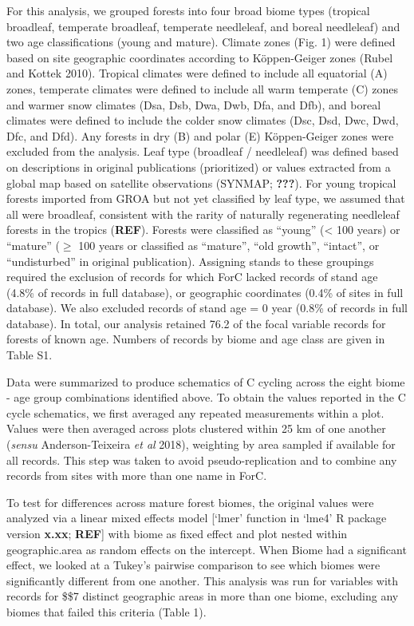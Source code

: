 \documentclass[
]{article}
\begin{document}
For this analysis, we grouped forests into four broad biome types
(tropical broadleaf, temperate broadleaf, temperate needleleaf, and
boreal needleleaf) and two age classifications (young and mature).
Climate zones (Fig. 1) were defined based on site geographic coordinates
according to Köppen-Geiger zones (Rubel and Kottek 2010). Tropical
climates were defined to include all equatorial (A) zones, temperate
climates were defined to include all warm temperate (C) zones and warmer
snow climates (Dsa, Dsb, Dwa, Dwb, Dfa, and Dfb), and boreal climates
were defined to include the colder snow climates (Dsc, Dsd, Dwc, Dwd,
Dfc, and Dfd). Any forests in dry (B) and polar (E) Köppen-Geiger zones
were excluded from the analysis. Leaf type (broadleaf / needleleaf) was
defined based on descriptions in original publications (prioritized) or
values extracted from a global map based on satellite observations
(SYNMAP; {\textbf{???}}). For young tropical forests imported from GROA
but not yet classified by leaf type, we assumed that all were broadleaf,
consistent with the rarity of naturally regenerating needleleaf forests
in the tropics (\textbf{REF}). Forests were classified as ``young''
(\textless{} 100 years) or ``mature'' (\(\ge\) 100 years or classified
as ``mature'', ``old growth'', ``intact'', or ``undisturbed'' in
original publication). Assigning stands to these groupings required the
exclusion of records for which ForC lacked records of stand age (4.8\%
of records in full database), or geographic coordinates (0.4\% of sites
in full database). We also excluded records of stand age = 0 year (0.8\%
of records in full database). In total, our analysis retained 76.2 of
the focal variable records for forests of known age. Numbers of records
by biome and age class are given in Table S1.

Data were summarized to produce schematics of C cycling across the eight
biome - age group combinations identified above. To obtain the values
reported in the C cycle schematics, we first averaged any repeated
measurements within a plot. Values were then averaged across plots
clustered within 25 km of one another (\emph{sensu} Anderson-Teixeira
\emph{et al} 2018), weighting by area sampled if available for all
records. This step was taken to avoid pseudo-replication and to combine
any records from sites with more than one name in ForC.

To test for differences across mature forest biomes, the original values
were analyzed via a linear mixed effects model {[}`lmer' function in
`lme4' R package version \textbf{x.xx}; \textbf{REF}{]} with biome as
fixed effect and plot nested within geographic.area as random effects on
the intercept. When Biome had a significant effect, we looked at a
Tukey's pairwise comparison to see which biomes were significantly
different from one another. This analysis was run for variables with
records for \$\ge\$7 distinct geographic areas in more than one biome,
excluding any biomes that failed this criteria (Table 1).
\end{document}
